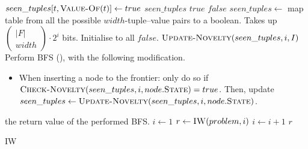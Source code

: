 \begin{algorithm}[hbtp]
\newcommand{\nchoosek}[2]{\left(\begin{array}{c}#1 \\ #2 \end{array}\right)}
\begin{algorithmic}
      \State $seen\_tuples[t, \Call{Value-Of}{t}] \gets true$
    \EndFor
    \State \Return $seen\_tuples$
  \EndFunction
       \Return $true$
      \EndIf
    \EndFor
    \State \Return $false$
  \EndFunction
    \State $seen\_tuples \gets$ map table from all the possible
      $width$-tuple--value pairs to a boolean. Takes up $\nchoosek{|F|}{width}\cdot
      2^i$ bits. Initialise to all $false$.
    \State $\Call{Update-Novelty}{seen\_tuples, i, I}$
    \State Perform \ac{BFS} (), with the following modification.
    \begin{itemize}
      \item[] When inserting a node to the frontier: only do so if
        $\Call{Check-Novelty}{seen\_tuples, i, node.\textsc{State}} = true$. Then,
        update $seen\_tuples \gets \Call{Update-Novelty}{seen\_tuples, i,
        node.\textsc{State}}$.
    \end{itemize}
    \State \Return the return value of the performed \ac{BFS}.
  \EndFunction
    \State $i \gets 1$
    \Repeat
      \State $r \gets \Call{IW}{problem, i}$
      \State $i \gets i+1$
    \State \Return $r$
  \EndFunction
\end{algorithmic}
\caption{\acl{IW} \citep{lipovetzky2012width}}
\label{alg:iterated-width}
\end{algorithm}


